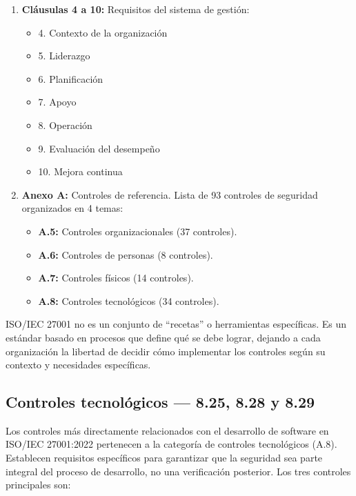 \begin{enumerate}
    \item \textbf{Cláusulas 4 a 10:} Requisitos del sistema de gestión:
    \begin{itemize}
        \item 4. Contexto de la organización
        \item 5. Liderazgo
        \item 6. Planificación
        \item 7. Apoyo
        \item 8. Operación
        \item 9. Evaluación del desempeño
        \item 10. Mejora continua
    \end{itemize}

    \item \textbf{Anexo A:} Controles de referencia. Lista de 93 controles de seguridad organizados en 4 temas:
    \begin{itemize}
        \item \textbf{A.5:} Controles organizacionales (37 controles).
        \item \textbf{A.6:} Controles de personas (8 controles).
        \item \textbf{A.7:} Controles físicos (14 controles).
        \item \textbf{A.8:} Controles tecnológicos (34 controles).
    \end{itemize}
\end{enumerate}

ISO/IEC 27001 no es un conjunto de ``recetas'' o herramientas específicas. Es un estándar basado en procesos que define qué se debe lograr, dejando a cada organización la libertad de decidir cómo implementar los controles según su contexto y necesidades específicas.

\subsection{Controles tecnológicos --- 8.25, 8.28 y 8.29}

Los controles más directamente relacionados con el desarrollo de software en ISO/IEC 27001:2022 pertenecen a la categoría de controles tecnológicos (A.8). Establecen requisitos específicos para garantizar que la seguridad sea parte integral del proceso de desarrollo, no una verificación posterior. Los tres controles principales son:

